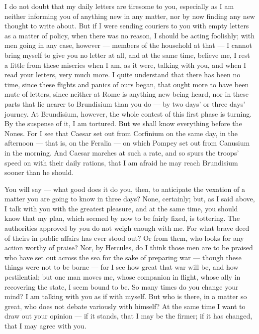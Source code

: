 

 I do not doubt that my daily letters are tiresome to you, especially as I am neither informing you of anything new in any matter, nor by now finding any new thought to write about. But if I were sending couriers to you with empty letters as a matter of policy, when there was no reason, I should be acting foolishly; with men going in any case, however --- members of the household at that --- I cannot bring myself to give you no letter at all, and at the same time, believe me, I rest a little from these miseries when I am, as it were, talking with you, and when I read your letters, very much more. I quite understand that there has been no time, since these flights and panics of ours began, that ought more to have been mute of letters, since neither at Rome is anything new being heard, nor in these parts that lie nearer to Brundisium than you do --- by two days' or three days' journey. At Brundisium, however, the whole contest of this first phase is turning. By the suspense of it, I am tortured. But we shall know everything before the Nones. For I see that Caesar set out from Corfinium on the same day, in the afternoon --- that is, on the Feralia --- on which Pompey set out from Canusium in the morning. And Caesar marches at such a rate, and so spurs the troops' speed on with their daily rations, that I am afraid he may reach Brundisium sooner than he should.

 You will say --- what good does it do you, then, to anticipate the vexation of a matter you are going to know in three days? None, certainly; but, as I said above, I talk with you with the greatest pleasure, and at the same time, you should know that my plan, which seemed by now to be fairly fixed, is tottering. The authorities approved by you do not weigh enough with me. For what brave deed of theirs in public affairs has ever stood out? Or from them, who looks for any action worthy of praise? Nor, by Hercules, do I think those men are to be praised who have set out across the sea for the sake of preparing war --- though these things were not to be borne --- for I see how great that war will be, and how pestilential; but one man moves me, whose companion in flight, whose ally in recovering the state, I seem bound to be. So many times do you change your mind? I am talking with you as if with myself. But who is there, in a matter so great, who does not debate variously with himself? At the same time I want to draw out your opinion --- if it stands, that I may be the firmer; if it has changed, that I may agree with you.

